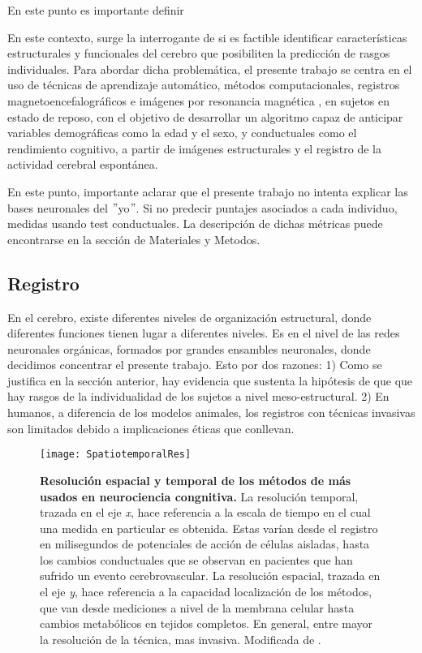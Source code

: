 \documentclass[11pt,letterpaper]{article}
\numberwithin{equation}{subsection}
\numberwithin{table}{subsection}
\begin{document}
\bigskip
\noindent En este punto es importante definir 


\bigskip
\noindent En este contexto, surge la interrogante de si es factible identificar características estructurales y funcionales del cerebro que posibiliten la predicción de rasgos individuales. Para abordar dicha problemática, el presente trabajo se centra en el uso de técnicas de aprendizaje automático, métodos computacionales, registros magnetoencefalográficos e imágenes por resonancia magnética , en sujetos en estado de reposo, con el objetivo de desarrollar un algoritmo capaz de  anticipar variables demográficas como la edad y el sexo, y conductuales como el rendimiento cognitivo, a partir de imágenes estructurales y el registro de la actividad cerebral espontánea.

\bigskip
\noindent En este punto, importante aclarar que el presente trabajo no intenta explicar las bases neuronales del $"$yo$"$. Si no predecir puntajes asociados a cada individuo, medidas usando test conductuales. La descripción de dichas métricas puede encontrarse en la sección de Materiales y Metodos.



\subsection{Registro}
\smallskip
\noindent En el cerebro, existe diferentes niveles de organización estructural, donde diferentes funciones tienen lugar a diferentes niveles. Es en el nivel de las redes neuronales orgánicas, formados por grandes ensambles neuronales, donde decidimos concentrar el presente trabajo. Esto por dos razones: 1) Como se justifica en la sección anterior, hay evidencia que sustenta la hipótesis de que que hay rasgos de la individualidad de los sujetos a nivel meso-estructural. 2) En humanos, a diferencia de los modelos animales, los registros con técnicas invasivas son limitados debido a implicaciones éticas que conllevan. 

 

\begin{figure}[H]
\centering
	\texttt{[image: SpatiotemporalRes]}
	\captionsetup{labelfont=bf}
	\caption{\scriptsize \textbf{Resolución espacial y temporal de los métodos de más usados en neurociencia congnitiva.} La resolución temporal, trazada en el eje \textit{x}, hace referencia a la escala de tiempo en el cual una medida en particular es obtenida. Estas varían desde el registro en milisegundos de potenciales de acción de células aisladas, hasta los cambios conductuales que se observan en pacientes que han sufrido un evento cerebrovascular. La resolución espacial, trazada en el eje \textit{y}, hace referencia a la capacidad localización de los métodos, que van desde mediciones a nivel de la membrana celular hasta cambios metabólicos en tejidos completos. En general, entre mayor la resolución de la técnica, mas invasiva. Modificada de \cite{fornito2016fundamentals}.}
	\label{fig:Fig1}
\end{figure}
\end{document}
